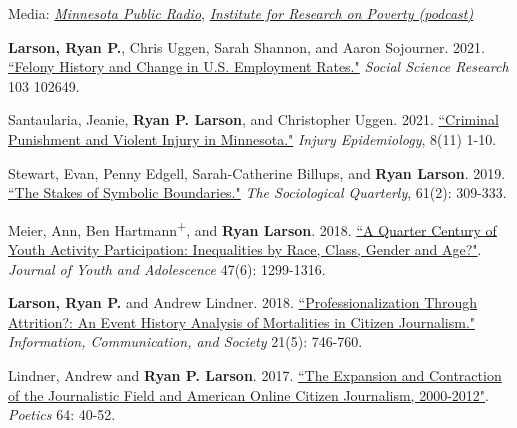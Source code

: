 \documentclass[letterpaper]{article}
\renewenvironment{itemize}{
  \begin{list}{}{
    \setlength{\leftmargin}{1.5em}
  }
}{
  \end{list}
}
\begin{document}
\begin{itemize}
\begin{itemize}
\item Media: \href{https://www.mprnews.org/story/2022/04/21/native-women-incarcerated}{\textit{Minnesota Public Radio}}, \href{https://www.irp.wisc.edu/resource/brieanna-watters-and-robert-stewart-on-native-americans-and-monetary-sanctions/}{\textit{Institute for Research on Poverty (podcast)}}
\end{itemize}

\item  \textbf{Larson, Ryan P.}, Chris Uggen, Sarah Shannon, and Aaron Sojourner. 2021. \href{https://ryanplarson.github.io/personal_site/pubs/larson_etal_22.pdf}{``Felony History and Change in U.S. Employment Rates."} \textit{Social Science Research} 103 102649.

\item  Santaularia, Jeanie, \textbf{Ryan P. Larson}, and Christopher Uggen. 2021. \href{https://ryanplarson.github.io/personal_site/pubs/santaularia_etal_21.pdf}{``Criminal Punishment and Violent Injury in Minnesota."} \textit{Injury Epidemiology}, 8(11) 1-10.

\item Stewart, Evan, Penny Edgell, Sarah-Catherine Billups, and \textbf{Ryan Larson}. 2019. \href{https://ryanplarson.github.io/personal_site/pubs/stewart_etal_19.pdf}{``The Stakes of Symbolic Boundaries."} \textit{The Sociological Quarterly}, 61(2): 309-333.

\item Meier, Ann, Ben Hartmann\textsuperscript{+}, and \textbf{Ryan Larson}. 2018.  \href{https://ryanplarson.github.io/personal_site/pubs/meier_etal_18.pdf}{``A Quarter Century of Youth Activity Participation: Inequalities by Race, Class, Gender and Age?"}. \textit{Journal of Youth and Adolescence} 47(6): 1299-1316.

\item \textbf{Larson, Ryan P.} and Andrew Lindner. 2018. \href{https://ryanplarson.github.io/personal_site/pubs/larson_lindner_18.pdf}{``Professionalization Through Attrition?: An Event History Analysis of Mortalities in Citizen Journalism."}  \textit{Information, Communication, and Society} 21(5): 746-760.

\item Lindner, Andrew and \textbf{Ryan P. Larson}. 2017. \href{https://ryanplarson.github.io/personal_site/pubs/lindner_larson_17.pdf}{``The Expansion and Contraction of the Journalistic Field and American Online Citizen Journalism, 2000-2012"}. \textit{Poetics} 64: 40-52.


\end{itemize}
\end{document}

